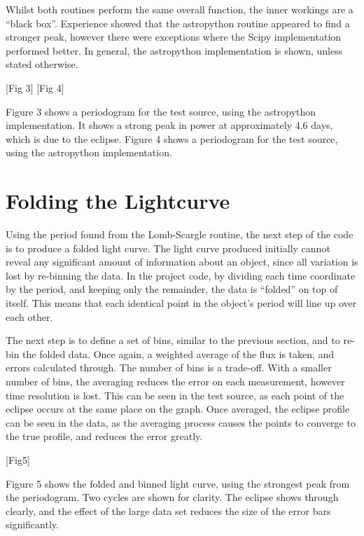 Whilst both routines perform the same overall function, the inner workings are a \textquotedblleft{}black box\textquotedblright{}. Experience showed that the astropython routine appeared to find a stronger peak, however there were exceptions where the Scipy implementation performed better. In general, the astropython implementation is shown, unless stated otherwise.


[Fig 3]
[Fig 4]

Figure 3 shows a periodogram for the test source, using the astropython implementation. It shows a strong peak in power at approximately 4.6 days, which is due to the eclipse.
Figure 4 shows a periodogram for the test source, using the astropython implementation. 

\section{Folding the Lightcurve}
Using the period found from the Lomb-Scargle routine, the next step of the code is to produce a folded light curve. The light curve produced initially cannot reveal any significant amount of information about an object, since all variation is lost by re-binning the data. In the project code, by dividing each time coordinate by the period, and keeping only the remainder, the data is \textquotedblleft{}folded\textquotedblright{} on top of itself. This means that each identical point in the object\textquoteright{}s period will line up over each other. 

The next step is to define a set of bins, similar to the previous section, and to re-bin the folded data. Once again, a weighted average of the flux is taken, and errors calculated through. The number of bins is a trade-off. With a smaller number of bins, the averaging reduces the error on each measurement, however time resolution is lost. This can be seen in the test source, as each point of the eclipse occurs at the same place on the graph. Once averaged, the eclipse profile can be seen in the data, as the averaging process causes the points to converge to the true profile, and reduces the error greatly. 

[Fig5]

Figure 5 shows the folded and binned light curve, using the strongest peak from the periodogram. Two cycles are shown for clarity. The eclipse shows through clearly, and the effect of the large data set reduces the size of the error bars significantly.


